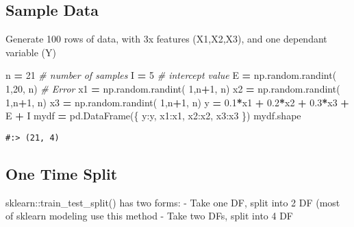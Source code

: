\documentclass[
]{book}
\newenvironment{Shaded}{\begin{snugshade}}{\end{snugshade}}
\newcommand{\CommentTok}[1]{\textcolor[rgb]{0.37,0.37,0.37}{\textit{#1}}}
\newcommand{\DecValTok}[1]{\textcolor[rgb]{0.06,0.06,0.06}{#1}}
\newcommand{\FloatTok}[1]{\textcolor[rgb]{0.06,0.06,0.06}{#1}}
\newcommand{\NormalTok}[1]{#1}
\newcommand{\OperatorTok}[1]{\textcolor[rgb]{0.43,0.43,0.43}{\textbf{#1}}}
\newcommand{\StringTok}[1]{\textcolor[rgb]{0.5,0.5,0.5}{#1}}
\begin{document}
\hypertarget{sample-data-20}{%
\subsection{Sample Data}\label{sample-data-20}}

Generate 100 rows of data, with 3x features (X1,X2,X3), and one dependant variable (Y)

\begin{Shaded}
\begin{Highlighting}[]
\NormalTok{n }\OperatorTok{=} \DecValTok{21}  \CommentTok{\# number of samples}
\NormalTok{I }\OperatorTok{=} \DecValTok{5}  \CommentTok{\# intercept value}
\NormalTok{E }\OperatorTok{=}\NormalTok{ np.random.randint( }\DecValTok{1}\NormalTok{,}\DecValTok{20}\NormalTok{, n)  }\CommentTok{\# Error}
\NormalTok{x1 }\OperatorTok{=}\NormalTok{ np.random.randint( }\DecValTok{1}\NormalTok{,n}\OperatorTok{+}\DecValTok{1}\NormalTok{, n)}
\NormalTok{x2 }\OperatorTok{=}\NormalTok{ np.random.randint( }\DecValTok{1}\NormalTok{,n}\OperatorTok{+}\DecValTok{1}\NormalTok{, n)}
\NormalTok{x3 }\OperatorTok{=}\NormalTok{ np.random.randint( }\DecValTok{1}\NormalTok{,n}\OperatorTok{+}\DecValTok{1}\NormalTok{, n)}
\NormalTok{y }\OperatorTok{=} \FloatTok{0.1}\OperatorTok{*}\NormalTok{x1 }\OperatorTok{+} \FloatTok{0.2}\OperatorTok{*}\NormalTok{x2 }\OperatorTok{+} \FloatTok{0.3}\OperatorTok{*}\NormalTok{x3 }\OperatorTok{+}\NormalTok{ E }\OperatorTok{+}\NormalTok{ I}
\NormalTok{mydf }\OperatorTok{=}\NormalTok{ pd.DataFrame(\{}
    \StringTok{\textquotesingle{}y\textquotesingle{}}\NormalTok{:y,}
    \StringTok{\textquotesingle{}x1\textquotesingle{}}\NormalTok{:x1,}
    \StringTok{\textquotesingle{}x2\textquotesingle{}}\NormalTok{:x2,}
    \StringTok{\textquotesingle{}x3\textquotesingle{}}\NormalTok{:x3}
\NormalTok{\})}
\NormalTok{mydf.shape}
\end{Highlighting}
\end{Shaded}

\begin{verbatim}
#:> (21, 4)
\end{verbatim}

\hypertarget{one-time-split}{%
\subsection{One Time Split}\label{one-time-split}}

sklearn::train\_test\_split() has two forms: - Take one DF, split into 2 DF (most of sklearn modeling use this method - Take two DFs, split into 4 DF
\end{document}
